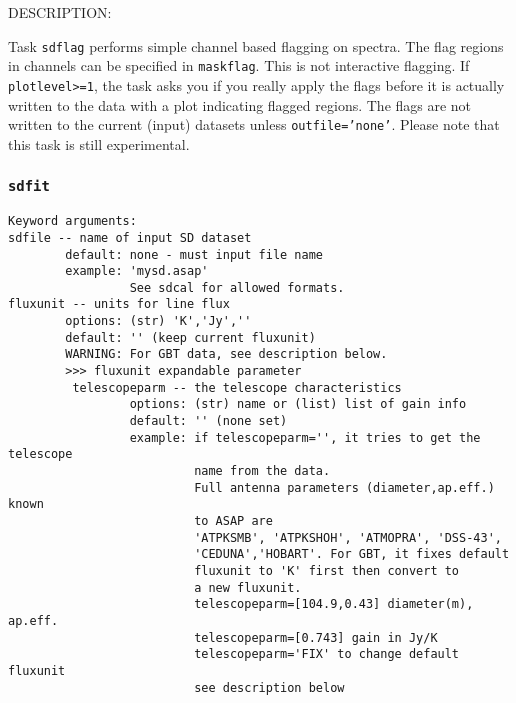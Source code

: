     DESCRIPTION:

    Task {\tt sdflag} performs simple channel based flagging on spectra.
    The flag regions in channels can be specified in {\tt maskflag}. This
    is not interactive flagging. If {\tt plotlevel>=1}, the task asks 
    you if you really apply the flags before it is actually written to the data 
    with a plot indicating flagged regions. The flags
    are not written to the current (input) datasets unless {\tt outfile='none'}.
    Please note that this task is still experimental.


\subsubsection{{\tt sdfit}}
\label{section:sd.sdtasks.tasks.sdfit}

\begin{verbatim}
Keyword arguments:
sdfile -- name of input SD dataset
        default: none - must input file name
        example: 'mysd.asap'
                 See sdcal for allowed formats.
fluxunit -- units for line flux
        options: (str) 'K','Jy',''
        default: '' (keep current fluxunit)
        WARNING: For GBT data, see description below.
        >>> fluxunit expandable parameter
         telescopeparm -- the telescope characteristics
                 options: (str) name or (list) list of gain info
                 default: '' (none set)
                 example: if telescopeparm='', it tries to get the telescope
                          name from the data.
                          Full antenna parameters (diameter,ap.eff.) known
                          to ASAP are
                          'ATPKSMB', 'ATPKSHOH', 'ATMOPRA', 'DSS-43',
                          'CEDUNA','HOBART'. For GBT, it fixes default 
                          fluxunit to 'K' first then convert to 
                          a new fluxunit.
                          telescopeparm=[104.9,0.43] diameter(m), ap.eff.
                          telescopeparm=[0.743] gain in Jy/K
                          telescopeparm='FIX' to change default fluxunit
                          see description below


\end{verbatim}
